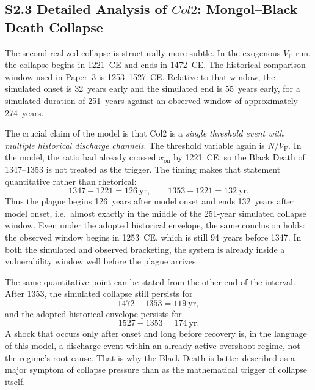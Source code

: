 \documentclass[11pt]{article}
\newcommand{\VF}{V_{\mathrm{F}}}
\newcommand{\xon}{x_{\mathrm{on}}}
\newcommand{\ColTwo}{Col2}
\begin{document}
\subsection*{S2.3 Detailed Analysis of \texorpdfstring{$\ColTwo$}{Col2}: Mongol--Black Death Collapse}

The second realized collapse is structurally more subtle. In the exogenous-$\VF$ run, the collapse begins in 1221~CE and ends in 1472~CE. The historical comparison window used in Paper~3 is 1253--1527~CE. Relative to that window, the simulated onset is 32~years early and the simulated end is 55~years early, for a simulated duration of 251~years against an observed window of approximately 274~years.

The crucial claim of the model is that \ColTwo{} is a \emph{single threshold event with multiple historical discharge channels}. The threshold variable again is $N/\VF$. In the model, the ratio had already crossed $\xon$ by 1221~CE, so the Black Death of 1347--1353 is not treated as the trigger. The timing makes that statement quantitative rather than rhetorical:
\begin{equation}
1347-1221 = 126\ \mathrm{yr},\qquad1353-1221 = 132\ \mathrm{yr}.
\end{equation}
Thus the plague begins 126~years after model onset and ends 132~years after model onset, i.e.\ almost exactly in the middle of the 251-year simulated collapse window. Even under the adopted historical envelope, the same conclusion holds: the observed window begins in 1253~CE, which is still 94~years before 1347. In both the simulated and observed bracketing, the system is already inside a vulnerability window well before the plague arrives.

The same quantitative point can be stated from the other end of the interval. After 1353, the simulated collapse still persists for
\begin{equation}
1472-1353 = 119\ \mathrm{yr},
\end{equation}
and the adopted historical envelope persists for
\begin{equation}
1527-1353 = 174\ \mathrm{yr}.
\end{equation}
A shock that occurs only after onset and long before recovery is, in the language of this model, a discharge event within an already-active overshoot regime, not the regime's root cause. That is why the Black Death is better described as a major symptom of collapse pressure than as the mathematical trigger of collapse itself.
\end{document}
